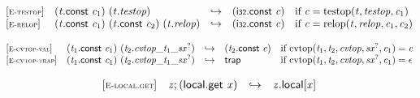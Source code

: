 \vspace{1ex}

$$
\begin{array}{@{}l@{}lcl@{}l@{}}
{[\textsc{\scriptsize E{-}testop}]} \quad & ({\mathit{t}}.\mathsf{const}~{\mathit{c}}_{{1}})~({\mathit{t}} . {\mathit{testop}}) &\hookrightarrow& (\mathsf{i{\scriptstyle32}}.\mathsf{const}~{\mathit{c}}) &\quad
  \mbox{if}~{\mathit{c}} = {\mathrm{testop}}({\mathit{t}}, {\mathit{testop}}, {\mathit{c}}_{{1}}) \\
{[\textsc{\scriptsize E{-}relop}]} \quad & ({\mathit{t}}.\mathsf{const}~{\mathit{c}}_{{1}})~({\mathit{t}}.\mathsf{const}~{\mathit{c}}_{{2}})~({\mathit{t}} . {\mathit{relop}}) &\hookrightarrow& (\mathsf{i{\scriptstyle32}}.\mathsf{const}~{\mathit{c}}) &\quad
  \mbox{if}~{\mathit{c}} = {\mathrm{relop}}({\mathit{t}}, {\mathit{relop}}, {\mathit{c}}_{{1}}, {\mathit{c}}_{{2}}) \\
\end{array}
$$

\vspace{1ex}

$$
\begin{array}{@{}l@{}lcl@{}l@{}}
{[\textsc{\scriptsize E{-}cvtop{-}val}]} \quad & ({\mathit{t}}_{{1}}.\mathsf{const}~{\mathit{c}}_{{1}})~({\mathit{t}}_{{2}} . {{{{{\mathit{cvtop}}}{\mathsf{\_}}}{{\mathit{t}}_{{1}}}}{\mathsf{\_}}}{{{\mathit{sx}}^?}}) &\hookrightarrow& ({\mathit{t}}_{{2}}.\mathsf{const}~{\mathit{c}}) &\quad
  \mbox{if}~{\mathrm{cvtop}}({\mathit{t}}_{{1}}, {\mathit{t}}_{{2}}, {\mathit{cvtop}}, {{\mathit{sx}}^?}, {\mathit{c}}_{{1}}) = {\mathit{c}} \\
{[\textsc{\scriptsize E{-}cvtop{-}trap}]} \quad & ({\mathit{t}}_{{1}}.\mathsf{const}~{\mathit{c}}_{{1}})~({\mathit{t}}_{{2}} . {{{{{\mathit{cvtop}}}{\mathsf{\_}}}{{\mathit{t}}_{{1}}}}{\mathsf{\_}}}{{{\mathit{sx}}^?}}) &\hookrightarrow& \mathsf{trap} &\quad
  \mbox{if}~{\mathrm{cvtop}}({\mathit{t}}_{{1}}, {\mathit{t}}_{{2}}, {\mathit{cvtop}}, {{\mathit{sx}}^?}, {\mathit{c}}_{{1}}) = \epsilon \\
\end{array}
$$

\vspace{1ex}

$$
\begin{array}{@{}l@{}lcl@{}l@{}}
{[\textsc{\scriptsize E{-}local.get}]} \quad & {\mathit{z}} ; (\mathsf{local.get}~{\mathit{x}}) &\hookrightarrow& {{\mathit{z}}.\mathsf{local}}{{}[{\mathit{x}}]} &  \\
\end{array}
$$

